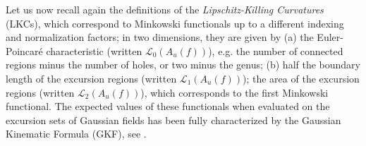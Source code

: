 \documentclass[aps,prd,showpacs,superscriptaddress,groupedaddress]{revtex4-1}  %
\begin{document}


Let us now recall again the definitions of the \emph{Lipschitz-Killing Curvatures} (LKCs), which correspond to Minkowski functionals up to a different indexing and normalization factors; in two dimensions, they are given by  (a) the Euler-Poincar\'{e} characteristic (written $\mathcal{L}_{0}(A_{u}(f))$), e.g. the number of connected
regions minus the number of holes, or two minus the genus; (b) half the boundary length of
the excursion regions (written $\mathcal{L}_{1}(A_{u}(f))$); the area of the excursion
regions (written $\mathcal{L}_{2}(A_{u}(f))$), which corresponds to the first Minkowski functional. The expected values of these functionals when evaluated on the excursion sets of Gaussian fields has been fully characterized by the Gaussian Kinematic Formula (GKF), see \cite{TaylorAdler2009}. 
\end{document}
